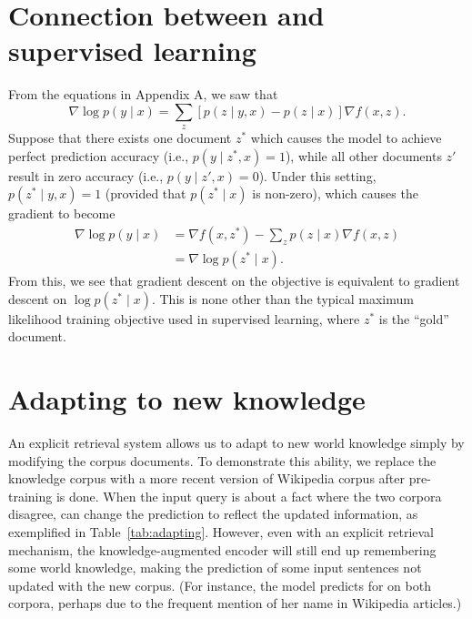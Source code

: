 \section{Connection between \thename and supervised learning}
%
From the equations in Appendix A, we saw that 
\[
\nabla\log p\left(y\mid x\right)=\sum_{z}\left[p\left(z\mid y,x\right)-p\left(z\mid x\right)\right]\nabla f(x,z).
\]
Suppose that there exists one document $z^{*}$ which causes the model
to achieve perfect prediction accuracy (i.e., $p\left(y\mid z^{*},x\right)=1$), while all other documents $z'$ result in zero accuracy (i.e., $p\left(y\mid z',x\right)=0$).
Under this setting, $p\left(z^{*}\mid y,x\right)=1$ (provided that
$p\left(z^{*}\mid x\right)$ is non-zero), which causes the gradient
to become
\begin{align*}
\nabla\log p\left(y\mid x\right) & =\nabla f\left(x,z^{*}\right)-\sum_{z}p\left(z\mid x\right)\nabla f(x,z)\\
 & =\nabla\log p\left(z^{*}\mid x\right).
\end{align*}
From this, we see that gradient descent on the \thename objective is
equivalent to gradient descent on $\log p\left(z^{*}\mid x\right)$.
This is none other than the typical maximum likelihood training objective
used in supervised learning, where $z^{*}$ is the ``gold'' document.


\section{Adapting to new knowledge}

An explicit retrieval system allows us to adapt to new world knowledge
simply by modifying the corpus documents.
To demonstrate this ability,
we replace the knowledge corpus with a more recent version of Wikipedia corpus after pre-training is done.
When the input query is about a fact where the two corpora disagree,
\thename can change the prediction to reflect the updated information,
as exemplified in Table~\ref{tab:adapting}.
However, even with an explicit retrieval mechanism,
the knowledge-augmented encoder will still end up remembering some world knowledge,
making the prediction of some input sentences not updated with the new corpus.
(For instance, the model predicts  for  on both corpora, perhaps due to the frequent mention of her name in Wikipedia articles.)


